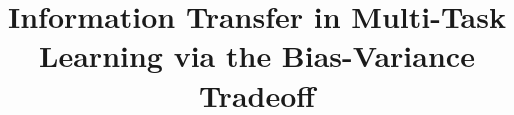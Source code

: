 \documentclass{article}
\begin{document}
\title{Information Transfer in Multi-Task Learning via the Bias-Variance Tradeoff}
\maketitle




%







\appendix






\end{document}

